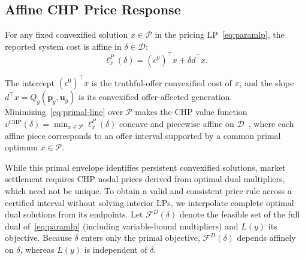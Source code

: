 \documentclass[journal]{IEEEtran}
\newcommand{\bp}{\bm p}
\newcommand{\bu}{\bm u}
\newcommand{\CHP}{\mathrm{CHP}}
\begin{document}
\subsection{Affine CHP Price Response}
For any fixed convexified solution $x\in\mathcal{P}$ in the pricing LP~\eqref{eq:paramlp}, the reported system cost is affine in $\delta\in\mathcal{D}$:
\begin{equation}
\ell_x^P(\delta) = (c^0)^\top x + \delta d^\top x.\label{eq:primal-line}
\end{equation}

The intercept $(c^0)^\top x$ is the truthful-offer convexified cost of $x$, and the slope $d^\top x=Q_g(\bp_g,\bu_g)$ is its convexified offer-affected generation. Minimizing~\eqref{eq:primal-line} over $\mathcal{P}$ makes the CHP value function $v^{\CHP}(\delta)\!\!=\!\!\min_{x\!\in\mathcal{P}}\ell_x^P(\delta)$ concave and piecewise affine on $\mathcal{D}$~\cite{bertsimas1997}, where each affine piece corresponds to an offer interval supported by a common primal optimum $\bar{x}\in\mathcal{P}$.

While this primal envelope identifies persistent convexified solutions, market settlement requires CHP nodal prices derived from optimal dual multipliers, which need not be unique. To obtain a valid and consistent price rule across a certified interval without solving interior LPs, we interpolate complete optimal dual solutions from its endpoints. Let $\mathcal{F}^D(\delta)$ denote the feasible set of the full dual of~\eqref{eq:paramlp} (including variable-bound multipliers) and $L(y)$ its objective. Because $\delta$ enters only the primal objective, $\mathcal{F}^D(\delta)$ depends affinely on $\delta$, whereas $L(y)$ is independent of $\delta$.
\end{document}
